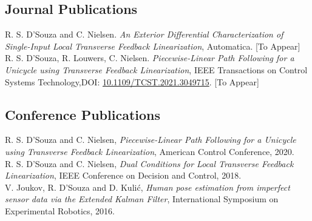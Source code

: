 \documentclass[oneside, 10pt]{memoir}
\begin{document}
\subsection*{Journal Publications}
R. S. D'Souza and C. Nielsen. \emph{An Exterior Differential Characterization of Single-Input Local Transverse Feedback Linearization}, Automatica. [To Appear]\hspace*{\fill}\\[1em]
R. S. D'Souza, R. Louwers, C. Nielsen. \emph{Piecewise-Linear Path Following for a Unicycle using Transverse Feedback Linearization}, IEEE Transactions on Control Systems Technology,\hspace*{\fill}\linebreak DOI: \href{https://dx.doi.org/10.1109/TCST.2021.3049715}{10.1109/TCST.2021.3049715}. [To Appear]\hspace*{\fill}

\subsection*{Conference Publications}
R. S. D'Souza and C. Nielsen, \emph{Piecewise-Linear Path Following for a Unicycle using Transverse Feedback Linearization}, American Control Conference, 2020.\hspace*{\fill}\\[1em]
R. S. D'Souza and C. Nielsen, \emph{Dual Conditions for Local Transverse Feedback Linearization}, IEEE Conference on Decision and Control, 2018.\hspace*{\fill}\\[1em]
V. Joukov, R. D'Souza and D. Kuli\'{c}, \emph{Human pose estimation from imperfect sensor data via the Extended Kalman 
Filter}, International Symposium on Experimental Robotics, 2016.\hspace*{\fill}
\end{document}
